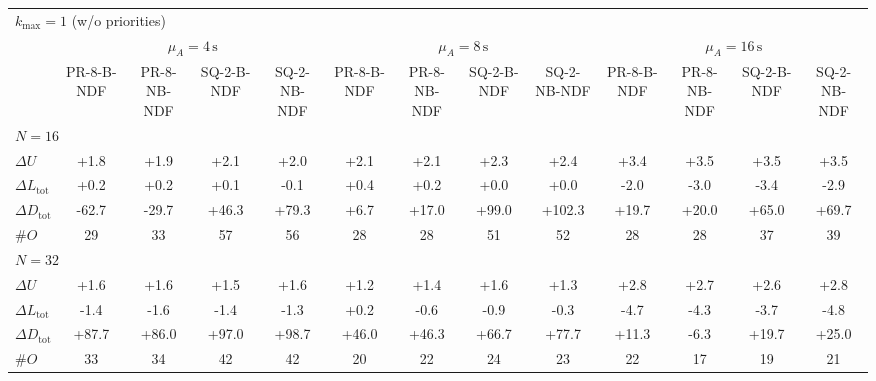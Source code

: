 \begin{tabular}{l c c c c c c c c c c c c}
\toprule
\multicolumn{13}{l}{$k_{\max}=1$ (w/o priorities)} \\
\addlinespace[0.2em]
 & \multicolumn{4}{c}{$\mu_A=4\,\mathrm{s}$} & \multicolumn{4}{c}{$\mu_A=8\,\mathrm{s}$} & \multicolumn{4}{c}{$\mu_A=16\,\mathrm{s}$} \\
\cmidrule(lr){2-5}\cmidrule(lr){6-9}\cmidrule(lr){10-13}
 & PR-8-B-NDF & PR-8-NB-NDF & SQ-2-B-NDF & SQ-2-NB-NDF & PR-8-B-NDF & PR-8-NB-NDF & SQ-2-B-NDF & SQ-2-NB-NDF & PR-8-B-NDF & PR-8-NB-NDF & SQ-2-B-NDF & SQ-2-NB-NDF \\
\midrule
\multicolumn{13}{l}{${N=16}$} \\
\midrule
$\Delta U$ & +1.8 & +1.9 & +2.1 & +2.0 & +2.1 & +2.1 & +2.3 & +2.4 & +3.4 & +3.5 & +3.5 & +3.5 \\
$\Delta L_{\mathrm{tot}}$ & +0.2 & +0.2 & +0.1 & -0.1 & +0.4 & +0.2 & +0.0 & +0.0 & -2.0 & -3.0 & -3.4 & -2.9 \\
$\Delta D_{\mathrm{tot}}$ & -62.7 & -29.7 & +46.3 & +79.3 & +6.7 & +17.0 & +99.0 & +102.3 & +19.7 & +20.0 & +65.0 & +69.7 \\
$\#O$ & 29 & 33 & 57 & 56 & 28 & 28 & 51 & 52 & 28 & 28 & 37 & 39 \\
\midrule
\multicolumn{13}{l}{${N=32}$} \\
\midrule
$\Delta U$ & +1.6 & +1.6 & +1.5 & +1.6 & +1.2 & +1.4 & +1.6 & +1.3 & +2.8 & +2.7 & +2.6 & +2.8 \\
$\Delta L_{\mathrm{tot}}$ & -1.4 & -1.6 & -1.4 & -1.3 & +0.2 & -0.6 & -0.9 & -0.3 & -4.7 & -4.3 & -3.7 & -4.8 \\
$\Delta D_{\mathrm{tot}}$ & +87.7 & +86.0 & +97.0 & +98.7 & +46.0 & +46.3 & +66.7 & +77.7 & +11.3 & -6.3 & +19.7 & +25.0 \\
$\#O$ & 33 & 34 & 42 & 42 & 20 & 22 & 24 & 23 & 22 & 17 & 19 & 21 \\
\bottomrule
\end{tabular}

